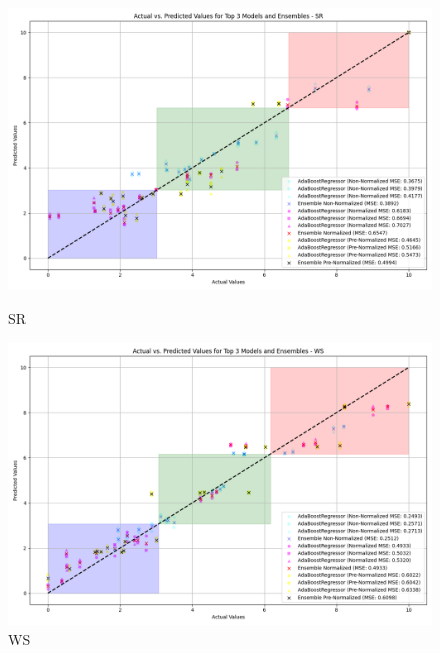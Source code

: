\begin{figure}[H]
    \centering
    \begin{minipage}{0.45\textwidth}
        \centering
        \includegraphics[width=\linewidth]{reg_section_all/ensemble_learning/actual_vs_predicted_top_3_models_and_ensembles_SR.png}
        \caption{SR}
        \label{reg_all_fig:sr_ensemble}
    \end{minipage}\hfill
    \begin{minipage}{0.45\textwidth}
        \centering
        \includegraphics[width=\linewidth]{reg_section_all/ensemble_learning/actual_vs_predicted_top_3_models_and_ensembles_WS.png}
        \caption{WS}
        \label{reg_all_fig:ws_ensemble}
    \end{minipage}
\end{figure}

